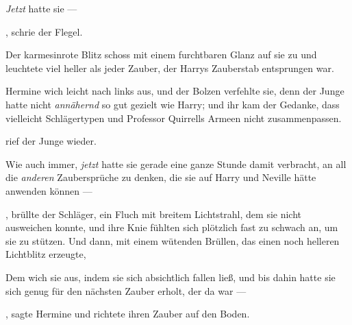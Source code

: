 \emph{Jetzt} hatte sie —

, schrie der Flegel.

Der karmesinrote Blitz schoss mit einem furchtbaren Glanz auf sie zu und leuchtete viel heller als jeder Zauber, der Harrys Zauberstab entsprungen war.

Hermine wich leicht nach links aus, und der Bolzen verfehlte sie, denn der Junge hatte nicht \emph{annähernd} so gut gezielt wie Harry; und ihr kam der Gedanke, dass vielleicht Schlägertypen und Professor Quirrells Armeen nicht zusammenpassen.

 rief der Junge wieder.  

Wie auch immer, \emph{jetzt} hatte sie gerade eine ganze Stunde damit verbracht, an all die \emph{anderen} Zaubersprüche zu denken, die sie auf Harry und Neville hätte anwenden können —

, brüllte der Schläger, ein Fluch mit breitem Lichtstrahl, dem sie nicht ausweichen konnte, und ihre Knie fühlten sich plötzlich fast zu schwach an, um sie zu stützen. Und dann, mit einem wütenden Brüllen, das einen noch helleren Lichtblitz erzeugte, 

Dem wich sie aus, indem sie sich absichtlich fallen ließ, und bis dahin hatte sie sich genug für den nächsten Zauber erholt, der da war —

, sagte Hermine und richtete ihren Zauber auf den Boden.


